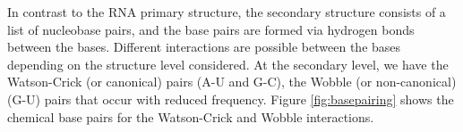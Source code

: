 In contrast to the RNA primary structure, the secondary structure consists of a list of nucleobase pairs, and the base pairs are formed via hydrogen bonds between the bases. Different interactions are possible between the bases depending on the structure level considered. At the secondary level, we have the Watson-Crick (or canonical) pairs \cite{seeman1976rna, rosenberg1976rna} (A-U and G-C), the Wobble (or non-canonical) (G-U) pairs that occur with reduced frequency. Figure \ref{fig:basepairing} shows the chemical base pairs for the Watson-Crick and Wobble interactions. 



